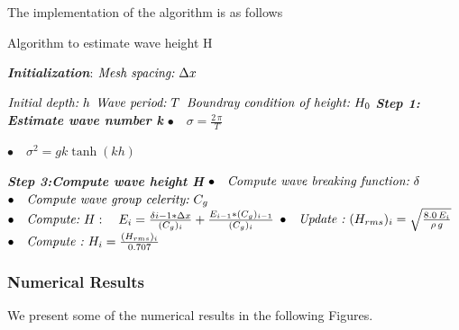 The implementation of the algorithm is as follows
\begin{algorithm}
\caption{Algorithm to estimate wave height H}\label{euclid}
\begin{algorithmic}[1]
\Procedure{}{}
\BState \emph{\textit{\textbf{Initialization}}}:
\State $\textit{Mesh spacing:\,\,} \Delta x$

\State $\textit{Initial depth:\,\,} h$
\State $\textit{Wave period:\,\,} T$
\State $\textit{Boundray condition of height:\,\,}H_{0}$
\BState \emph{\textbf{Step 1: Estimate wave number k}}
\State $\bullet \quad\sigma=\frac{2\, \pi}{T}$

\State $\bullet \quad\sigma^2=gk\tanh(kh)$

%
%

\BState \emph{\textbf{Step 3:Compute wave height H}}
\State $\bullet \quad\textit{Compute wave breaking function:\,\,} \delta$
\State $\bullet \quad\textit{Compute wave group celerity:\,\,} C_g$
\State $\bullet \quad\textit{Compute:\,\,} H:\quad E_{i}=\frac{\delta{i-1}*\Delta x}{(C_g)_{i}}+\frac{E_{i-1}*(C_g)_{i-1}}{(C_g)_{i}}$
\State $\bullet \quad\textit{Update :\,\,} (H_{rms})_{i}=\sqrt{\frac{8.0\,E_{i}}{\rho\, g}}$
\State $\bullet \quad\textit{Compute :\,\,} H_{i}=\frac{(H_{rms})_{i}}{0.707}$
\EndProcedure
\end{algorithmic}
\end{algorithm} 


\subsubsection{Numerical Results}
We present some of the numerical results in the following Figures.

